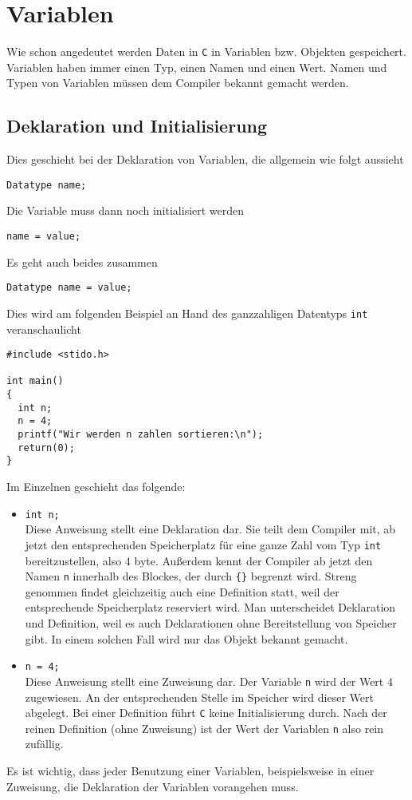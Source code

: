 \section{Variablen}

Wie schon angedeutet werden Daten in \texttt{C} in Variablen bzw. Objekten gespeichert.
Variablen haben immer einen Typ, einen Namen und einen Wert.
Namen und Typen von Variablen müssen dem Compiler bekannt gemacht werden.

\subsection{Deklaration und Initialisierung}

Dies geschieht bei der Deklaration von Variablen, die allgemein wie folgt aussieht
\begin{lstlisting}
Datatype name;
\end{lstlisting}
Die Variable muss dann noch initialisiert werden
\begin{lstlisting}
name = value;
\end{lstlisting}
Es geht auch beides zusammen
\begin{lstlisting}
Datatype name = value;
\end{lstlisting}
Dies wird am folgenden Beispiel an Hand des ganzzahligen Datentyps \texttt{int} veranschaulicht
\begin{lstlisting}[caption={Erste Variablendeklaration und -zuweisung}, belowcaptionskip=0.3em]
#include <stido.h>

int main()
{
  int n;
  n = 4;
  printf("Wir werden n zahlen sortieren:\n");
  return(0);
}
\end{lstlisting}
Im Einzelnen geschieht das folgende:
\begin{itemize}
\item \texttt{int n;}\\
  Diese Anweisung stellt eine Deklaration dar.
  Sie teilt dem Compiler mit, ab jetzt den ent\-sprechenden Speicherplatz für eine ganze Zahl vom Typ \texttt{int} bereitzustellen, also $4$ byte.
  Außerdem kennt der Compiler ab jetzt den Namen \texttt{n} innerhalb des Blockes, der durch \texttt{\{\}} begrenzt wird.
  Streng genommen findet gleichzeitig auch eine Definition statt, weil der ent\-sprechende Speicherplatz reserviert wird. 
  Man unterscheidet Deklaration und Definition, weil es auch Deklarationen ohne Bereitstellung von Speicher gibt.
  In einem solchen Fall wird nur das Objekt bekannt gemacht.

\item \verb|n = 4;|\\
  Diese Anweisung stellt eine Zuweisung dar.
  Der Variable \texttt{n} wird der Wert $4$ zugewiesen.
  An der entsprechenden Stelle im Speicher wird dieser Wert abgelegt.
  Bei einer Definition führt \texttt{C} keine Initialisierung durch.
  Nach der reinen Definition (ohne Zuweisung) ist der Wert der Variablen \texttt{n} also rein zufällig.
\end{itemize}
Es ist wichtig, dass jeder Benutzung einer Variablen, beispielsweise in einer Zuweisung, die Deklaration der Variablen vorangehen muss.


